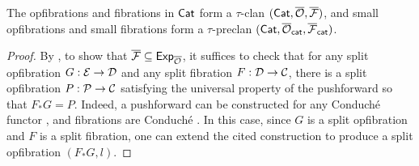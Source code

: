 \begin{proposition}\label{prop:pushforward-in-cat}
  The opfibrations and fibrations in $\mathsf{Cat}$ form a $\tau$-clan
  $(\mathsf{Cat},{\overline{{\mathcal{O}}}},{\overline{{\mathcal{F}}}})$,
  and small opfibrations and small fibrations form a $\tau$-preclan
  $(\mathsf{Cat},{\overline{{\mathcal{O}}}}_{\mathsf{cat}},{\overline{{\mathcal{F}}}}_{\mathsf{cat}})$.
\end{proposition}
\begin{proof}
  By ,
  to show that ${\overline{{\mathcal{F}}}} \subseteq \mathsf{Exp}_{\overline{{\mathcal{O}}}}$,
  it suffices to check that for any split opfibration $G : \mathcal{E} \to \mathcal{D}$
  and any split fibration $F : \mathcal{D} \to \mathcal{C}$,
  there is a split opfibration $P : \mathcal{P} \to \mathcal{C}$
  satisfying the universal property of the pushforward
  so that $F_* G = P$.
  Indeed, a pushforward can be constructed for
  any Conduch\'e functor \cite[Proposition 1.5.1]{vidmar2018},
  and fibrations are Conduch\'e \cite[Lemma 1.2.10]{vidmar2018}.
  In this case,
  since $G$ is a split opfibration and $F$ is a split fibration,
  one can extend the cited construction to produce a split opfibration
  $(F_* G, l)$.
\end{proof}

